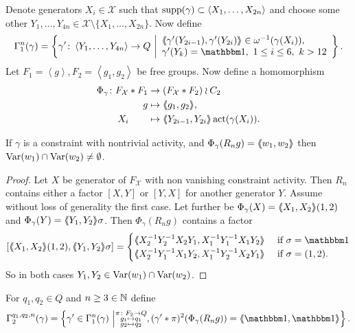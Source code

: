 \documentclass[a4paper,11pt]{amsart}
\begin{document}
 Denote generators $X_i\in\mathcal{X}$ such that $\operatorname{{supp}}(\gamma) \subset \left<X_1,\dotsc,X_{2n}\right>$ and choose some 
 other $Y_1,\dotsc,Y_{4n} \in\mathcal{X} \setminus \{X_1,\dotsc,X_{2n}\}$. 
 Now define
  \[\Gamma_1^n(\gamma) = \left \{\gamma' 
  \colon \left< Y_1,\ldots ,Y_{4n}\right> \to Q \bigmid
  \begin{array}{l}
   \pair{\gamma'(Y_{2i-1}),\gamma'(Y_{2i})}\in \omega^{-1}(\gamma(X_i)),\ \\
   \gamma'(Y_k) = \id,\ 1\leq i\leq 6,\ k>12
    \end{array} \right\}.\]
 Let $F_1=\left<g\right>,F_2=\left<g_1,g_2\right>$ be free groups. 
 Now define a homomorphism  
 \begin{align*}
  \Phi_{\gamma}\colon F_{\mathcal{X}}*F_1 &\to (F_{\mathcal{X}}*F_2)\wr C_2 \\ g&\mapsto \langle\negthickspace\langle g_1,g_2\rangle\negthickspace\rangle,\\ X_i\qquad &\mapsto \langle\negthickspace\langle Y_{2i-1},Y_{2i}\rangle\negthickspace\rangle\operatorname{act}(\gamma(X_i)).
 \end{align*}
\begin{lem} \label{lem:commonVar}
 If $\gamma$ is a constraint with nontrivial activity, and $\Phi_\gamma(R_ng)=\langle\negthickspace\langle w_1,w_2\rangle\negthickspace\rangle$ 
 then $\textup{Var}(w_1)\cap\textup{Var}(w_2)\neq \emptyset$.
\end{lem}
\begin{proof}
 Let $X$ be generator of $F_{\mathcal{X}}$ with non vanishing constraint activity. 
 Then $R_n$ contains either a factor $[X,Y]$ or $[Y,X]$ for another generator $Y$. 
 Assume without loss of generality the first case. Let further be 
 $\Phi_\gamma(X)=\langle\negthickspace\langle X_1,X_2\rangle\negthickspace\rangle(1,2)$ and $\Phi_\gamma(Y)=\langle\negthickspace\langle Y_1,Y_2\rangle\negthickspace\rangle\sigma$. 
 Then $\Phi_\gamma(R_n g)$ contains a factor 
 \[ [\pair{X_1,X_2}(1,2),\pair{Y_1,Y_2}\sigma] = \begin{cases}
                                                   \pair{X_2^{-1}Y_2^{-1}X_2Y_1,X_1^{-1}Y_1^{-1}X_1Y_2} & \textup{ if } \sigma=\id \\
                                                   \pair{X_2^{-1}Y_1^{-1}X_1Y_2,X_1^{-1}Y_2^{-1}X_2Y_1} & \textup{ if } \sigma=(1,2) . \\
                                                 \end{cases}
\] So in both cases $Y_1,Y_2\in \textup{Var}(w_1)\cap \textup{Var}(w_2)$. 
\end{proof}
For $q_1,q_2 \in Q$ and $n\geq3\in \mathbb{N}$ define
 \[\Gamma_2^{q_1,q_2,n}(\gamma) = \left\{\gamma'\in \Gamma_1^n(\gamma) \bigmid \substack{\pi\colon F_2\to Q\\
										g_1\mapsto q_1 \\
										g_2\mapsto q_2 }, (\gamma'*\pi)^2(\Phi_\gamma(R_ng))=\pair{\id,\id}\right\}.\] 
\end{document}
